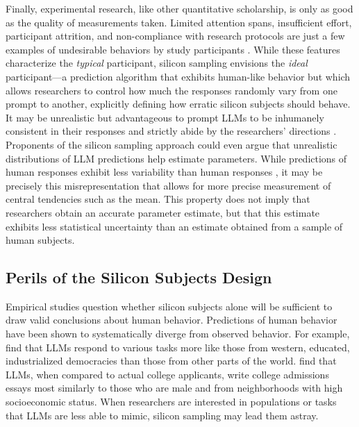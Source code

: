 \documentclass{article}
\begin{document}
Finally, experimental research, like other quantitative scholarship, is only as good as the quality of measurements taken. Limited attention spans, insufficient effort, participant attrition, and non-compliance with research protocols are just a few examples of undesirable behaviors by study participants \citep{stantcheva_how_2023}. While these features characterize the \textit{typical} participant, silicon sampling envisions the \textit{ideal} participant---a prediction algorithm that exhibits human-like behavior but which allows researchers to control how much the responses randomly vary from one prompt to another, explicitly defining how erratic silicon subjects should behave. It may be unrealistic but advantageous to prompt LLMs to be inhumanely consistent in their responses and strictly abide by the researchers' directions \citep{grossmann_ai_2023}. Proponents of the silicon sampling approach could even argue that unrealistic distributions of LLM predictions help estimate parameters. While predictions of human responses exhibit less variability than human responses \citep{Bisbee2024synthetic,mei2024turing}, it may be precisely this misrepresentation that allows for more precise measurement of central tendencies such as the mean. This property does not imply that researchers obtain an accurate parameter estimate, but that this estimate exhibits less statistical uncertainty than an estimate obtained from a sample of human subjects.

\subsection{Perils of the Silicon Subjects Design}\label{sec:perils-silicon}

Empirical studies question whether silicon subjects alone will be sufficient to draw valid conclusions about human behavior. Predictions of human behavior have been shown to systematically diverge from observed behavior. For example, \cite{atari_xue_park_blasi_henrich_2023} find that LLMs respond to various tasks more like those from western, educated, industrialized democracies than those from other parts of the world. \cite{alvero2024large} find that LLMs, when compared to actual college applicants, write college admissions essays most similarly to those who are male and from neighborhoods with high socioeconomic status. When researchers are interested in populations or tasks that LLMs are less able to mimic, silicon sampling may lead them astray. 
\end{document}
